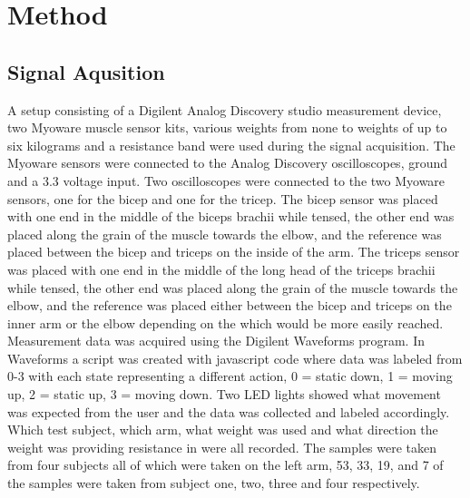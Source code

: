 \section{Method}
\label{section:method}



\subsection{Signal Aqusition}
A setup consisting of a Digilent Analog Discovery studio measurement device, two Myoware muscle sensor 
kits, various weights from none to weights of up to six kilograms and a resistance 
band were used during the signal acquisition. The Myoware sensors were connected to the Analog Discovery 
oscilloscopes, ground and a 3.3 voltage input. Two oscilloscopes were connected to the two Myoware 
sensors, one for the bicep and one for the tricep. The bicep sensor was placed with one end in the 
middle of the biceps brachii while tensed, the other end was placed along the grain of the muscle 
towards the elbow, and the reference was placed between the bicep and triceps on the inside of the arm. 
The triceps sensor was placed with one end in the middle of the long head of the triceps brachii while 
tensed, the other end was placed along the grain of the muscle towards the elbow, and the reference was 
placed either between the bicep and triceps on the inner arm or the elbow depending on the which would 
be more easily reached. Measurement data was acquired using the Digilent Waveforms program. In Waveforms a 
script was created with javascript code where data was labeled from 0-3 with each state representing a 
different action, 0 = static down, 1 = moving up, 2 = static up, 3 = moving down. Two LED lights showed what 
movement was expected from the user and the data was collected and labeled accordingly. Which test subject, 
which arm, what weight was used and what direction the weight was providing resistance in were all recorded. 
The samples were taken from four subjects all of which were taken on the left arm, 53, 33, 19, and 7 of the 
samples were taken from subject one, two, three and four respectively.


